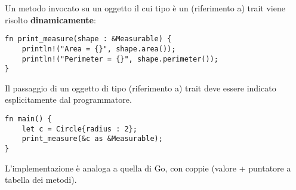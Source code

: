 \documentclass{article}
\begin{document}
Un metodo invocato su un oggetto il cui tipo è un (riferimento a) trait viene risolto \textbf{dinamicamente}:
\begin{tcolorbox}
\begin{verbatim}
fn print_measure(shape : &Measurable) {
    println!("Area = {}", shape.area());
    println!("Perimeter = {}", shape.perimeter());
}
\end{verbatim}
\end{tcolorbox}
Il passaggio di un oggetto di tipo (riferimento a) trait deve essere indicato esplicitamente dal programmatore.
\begin{tcolorbox}
\begin{verbatim}
fn main() {
    let c = Circle{radius : 2};
    print_measure(&c as &Measurable);
}
\end{verbatim}
\end{tcolorbox}
L'implementazione è analoga a quella di Go, con coppie (valore + puntatore a tabella dei metodi).
\end{document}
